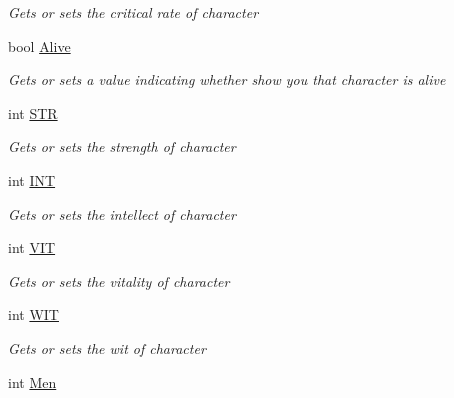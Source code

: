 \begin{DoxyCompactItemize}
\begin{DoxyCompactList}\small\item\em Gets or sets the critical rate of character \end{DoxyCompactList}\item 
bool \hyperlink{class_lightdeath_1_1_character__classes_a5c547899c2120dacbf73452bb91297a7}{Alive}
\begin{DoxyCompactList}\small\item\em Gets or sets a value indicating whether show you that character is alive \end{DoxyCompactList}\item 
int \hyperlink{class_lightdeath_1_1_character__classes_a9ff7bb19420750902a5422c57300e354}{S\+TR}
\begin{DoxyCompactList}\small\item\em Gets or sets the strength of character \end{DoxyCompactList}\item 
int \hyperlink{class_lightdeath_1_1_character__classes_a2555df99f37ef0a5524dfc4a5de49ab7}{I\+NT}
\begin{DoxyCompactList}\small\item\em Gets or sets the intellect of character \end{DoxyCompactList}\item 
int \hyperlink{class_lightdeath_1_1_character__classes_a2170ff333e7e3a186154f928db3b40df}{V\+IT}
\begin{DoxyCompactList}\small\item\em Gets or sets the vitality of character \end{DoxyCompactList}\item 
int \hyperlink{class_lightdeath_1_1_character__classes_a26cc95914cc503056a8909731959c0b9}{W\+IT}
\begin{DoxyCompactList}\small\item\em Gets or sets the wit of character \end{DoxyCompactList}\item 
int \hyperlink{class_lightdeath_1_1_character__classes_ac2e52f208728995cebaea78d0061f646}{Men}

\end{DoxyCompactItemize}
